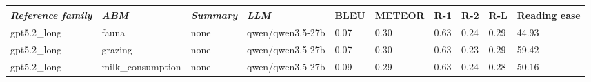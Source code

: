 \begin{tabular}{|l|l|l|l|l|l|l|l|l|l|}
\hline
\textit{\textbf{Reference family}} & \textit{\textbf{ABM}} & \textit{\textbf{Summary}} & \textit{\textbf{LLM}} & BLEU & METEOR & R-1 & R-2 & R-L & Reading ease \\
 \hline
 gpt5.2\_long & fauna & none & qwen/qwen3.5-27b & 0.07 & 0.30 & 0.63 & 0.24 & 0.29 & 44.93 \\
 \hline
 gpt5.2\_long & grazing & none & qwen/qwen3.5-27b & 0.07 & 0.30 & 0.63 & 0.23 & 0.29 & 59.42 \\
 \hline
 gpt5.2\_long & milk\_consumption & none & qwen/qwen3.5-27b & 0.09 & 0.29 & 0.63 & 0.24 & 0.28 & 50.16 \\
\hline
\end{tabular}
